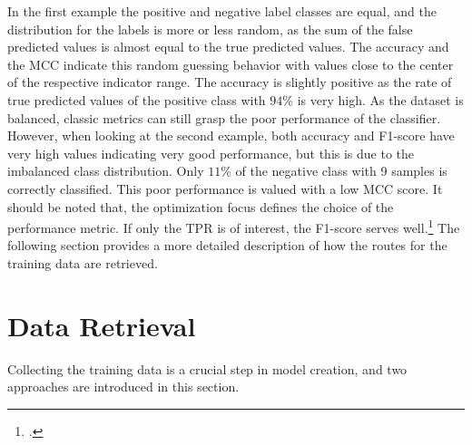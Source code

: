 In the first example the positive and negative label classes are equal, and the distribution for the
labels is more or less random, as the sum of the false predicted values is almost equal to
the true predicted values. The accuracy and the \gls{MCC} indicate this random guessing
behavior with values close to the center of the respective indicator range.
The accuracy is slightly positive as the rate of true predicted values of the positive class
with $94\%$ is very high. As the dataset is balanced, classic metrics can still grasp
the poor performance of the classifier. However, when looking at the second example, both
accuracy and F1-score have very high values indicating very good performance, but this is
due to the imbalanced class distribution. Only $11\%$ of the negative class with 9 samples
is correctly classified. This poor performance is valued with a low \gls{MCC} score.
It should be noted that, the optimization focus defines the choice of the performance metric.
If only the \gls{TPR} is of interest, the F1-score serves well.\footcite[cf.][p.8f.]{chicco_advantages_2020}
The following section provides a more detailed description of how the routes for the training data are retrieved.

\section{Data Retrieval}
\label{sec:DataRetrieval}

Collecting the training data is a crucial step in model creation, and two approaches are introduced in this section.

